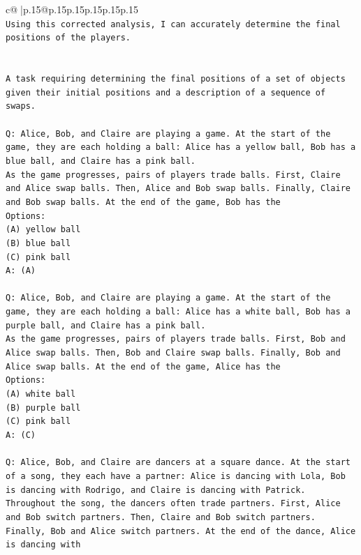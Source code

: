 \documentclass{article}
\begin{document}
{\begin{supertabular}{c@{$\;$}|p{.15\linewidth}@{}p{.15\linewidth}p{.15\linewidth}p{.15\linewidth}p{.15\linewidth}p{.15\linewidth}}
{{{\\ 
\texttt{Using this corrected analysis, I can accurately determine the final positions of the players.} \\
\\ 
\\ 
\texttt{A task requiring determining the final positions of a set of objects given their initial positions and a description of a sequence of swaps.} \\
\\ 
\texttt{Q: Alice, Bob, and Claire are playing a game. At the start of the game, they are each holding a ball: Alice has a yellow ball, Bob has a blue ball, and Claire has a pink ball.} \\
\texttt{As the game progresses, pairs of players trade balls. First, Claire and Alice swap balls. Then, Alice and Bob swap balls. Finally, Claire and Bob swap balls. At the end of the game, Bob has the} \\
\texttt{Options:} \\
\texttt{(A) yellow ball} \\
\texttt{(B) blue ball} \\
\texttt{(C) pink ball} \\
\texttt{A: (A)} \\
\\ 
\texttt{Q: Alice, Bob, and Claire are playing a game. At the start of the game, they are each holding a ball: Alice has a white ball, Bob has a purple ball, and Claire has a pink ball.} \\
\texttt{As the game progresses, pairs of players trade balls. First, Bob and Alice swap balls. Then, Bob and Claire swap balls. Finally, Bob and Alice swap balls. At the end of the game, Alice has the} \\
\texttt{Options:} \\
\texttt{(A) white ball} \\
\texttt{(B) purple ball} \\
\texttt{(C) pink ball} \\
\texttt{A: (C)} \\
\\ 
\texttt{Q: Alice, Bob, and Claire are dancers at a square dance. At the start of a song, they each have a partner: Alice is dancing with Lola, Bob is dancing with Rodrigo, and Claire is dancing with Patrick.} \\
\texttt{Throughout the song, the dancers often trade partners. First, Alice and Bob switch partners. Then, Claire and Bob switch partners. Finally, Bob and Alice switch partners. At the end of the dance, Alice is dancing with} \\
}}}
\end{supertabular}}
\end{document}
